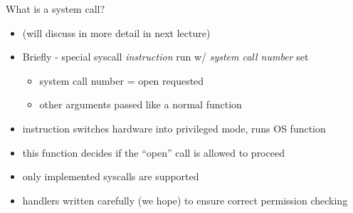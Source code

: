 \begin{frame}{What is a system call?}

	\begin{itemize}
	\item (will discuss in more detail in next lecture)
	\item Briefly - special syscall {\em instruction} run w/ \textit{system call number} set
            \begin{itemize}
            \item system call number = open requested
            \item other arguments passed like a normal function
            \end{itemize}
	\item instruction switches hardware into privileged mode, runs OS function
	\item this function decides if the ``open'' call is allowed to proceed
	\item only implemented syscalls are supported
	\item handlers written carefully (we hope) to ensure correct permission checking
	\end{itemize}

\end{frame}

